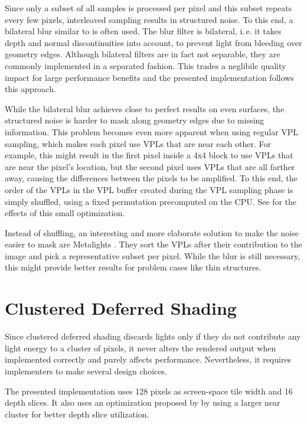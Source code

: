 Since only a subset of all samples is processed per pixel and this subset repeats every few pixels, interleaved sampling results in structured noise. To this end, a bilateral blur similar to \citet{laine2007incremental} is often used. The blur filter is bilateral, i.\,e. it takes depth and normal discontinuities into account, to prevent light from bleeding over geometry edges. Although bilateral filters are in fact not separable, they are commonly implemented in a separated fashion. This trades a neglibile quality impact for large performance benefits and the presented implementation follows this approach.


While the bilateral blur achieves close to perfect results on even surfaces, the structured noise is harder to mask along geometry edges due to missing information. This problem becomes even more apparent when using regular VPL sampling, which makes each pixel use VPLs that are near each other. For example, this might result in the first pixel inside a 4x4 block to use VPLs that are near the pixel's location, but the second pixel uses VPLs that are all farther away, causing the differences between the pixels to be amplified. To this end, the order of the VPLs in the VPL buffer created during the VPL sampling phase is simply shuffled, using a fixed permutation precomputed on the CPU. See  for the effects of this small optimization.

Instead of shuffling, an interesting and more elaborate solution to make the noise easier to mask are Metalights \citep{Faure:2010:Metalights}. They sort the VPLs after their contribution to the image and pick a representative subset per pixel. While the blur is still necessary, this might provide better results for problem cases like thin structures.


\section{Clustered Deferred Shading}
\label{sec:impl:clusteredShading}

Since clustered deferred shading discards lights only if they do not contribute any light energy to a cluster of pixels, it never alters the rendered output when implemented correctly and purely affects performance. Nevertheless, it requires implementers to make several design choices.

The presented implementation uses 128 pixels as screen-space tile width and 16 depth slices. It also uses an optimization proposed by \citet{persson::2013::practical} by using a larger near cluster for better depth slice utilization.

